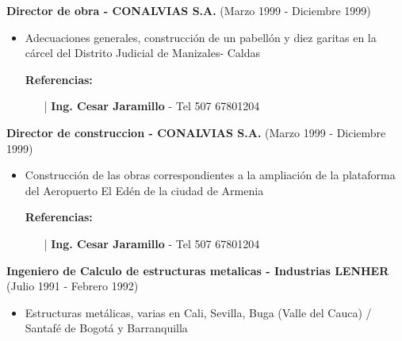 \documentclass[letterpaper,10pt]{article}
\begin{document}
  \vspace*{0.1cm}
  \textbf{Director de obra - CONALVIAS S.A.} (Marzo 1999 - Diciembre 1999)
  \hfill
  \vspace*{0.1cm}
  \begin{minipage}{\linewidth}
    \begin{itemize}[noitemsep]
      \item Adecuaciones generales, construcción de un pabellón y diez garitas en la cárcel del Distrito Judicial de Manizales- Caldas
      \item [] \textbf{Referencias:}
      \begin{itemize}[noitemsep]
        \vspace*{-0.2cm}
        \item [|] \textbf{Ing. Cesar Jaramillo} - Tel 507 67801204
      \end{itemize}
    \end{itemize}
    \hfill
  \end{minipage}

  \vspace*{0.1cm}
  \textbf{Director de construccion - CONALVIAS S.A.} (Marzo 1999 - Diciembre 1999)
  \hfill
  \vspace*{0.1cm}
  \begin{minipage}{\linewidth}
    \begin{itemize}[noitemsep]
      \item Construcción de las obras correspondientes a la ampliación de la plataforma del Aeropuerto El Edén de la ciudad de Armenia
      \item [] \textbf{Referencias:}
      \begin{itemize}[noitemsep]
        \vspace*{-0.2cm}
        \item [|] \textbf{Ing. Cesar Jaramillo} - Tel 507 67801204
      \end{itemize}
    \end{itemize}
    \hfill
  \end{minipage}

  \vspace*{0.1cm}
  \textbf{Ingeniero de Calculo de estructuras metalicas - Industrias LENHER} (Julio 1991 - Febrero 1992)
  \hfill
  \vspace*{0.1cm}
  \begin{minipage}{\linewidth}
    \begin{itemize}[noitemsep]
      \item Estructuras metálicas, varias en Cali, Sevilla, Buga (Valle del Cauca) / Santafé de Bogotá y Barranquilla
    \end{itemize}
    \hfill
  \end{minipage}
\end{document}
